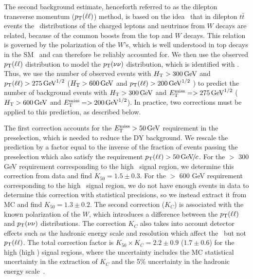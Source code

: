 The second  background estimate, henceforth referred to as the dilepton transverse momentum ($p_{\mathrm{T}}(\ell\ell)$) method, 
is  based on the  idea~\cite{ref:victory} that  in dilepton  $t\bar{t}$  events the
\pt\  distributions of  the charged  leptons and  neutrinos  from $W$
decays are  related, because of the  common boosts from  the top  and $W$
decays.  This relation  is governed by the polarization  of the $W$'s,
which         is         well         understood        in         top
decays in the SM~\cite{Wpolarization,Wpolarization2}   and   can  therefore   be
reliably  accounted   for.   We then  use   the  observed
$p_{\mathrm{T}}(\ell\ell)$ distribution to  model the $p_{\mathrm{T}}(\nu\nu)$ distribution,
which is  identified with \MET.  Thus,  we use the  number of observed
events  with $H_{\mathrm{T}} > 300\,\text{Ge\hspace{-.08em}V}$ and $p_{\mathrm{T}}(\ell\ell)  > 275\,\text{Ge\hspace{-.08em}V}^{1/2}$ 
($H_{\mathrm{T}} > 600\,\text{Ge\hspace{-.08em}V}$ and $p_{\mathrm{T}}(\ell\ell)  > 200\,\text{Ge\hspace{-.08em}V}^{1/2}$ )
to predict the  number of  background events  with 
$H_{\mathrm{T}} >  300\,\text{Ge\hspace{-.08em}V}$ and  $E_{\mathrm{T}}^{\text{miss}} = > 275\,\text{Ge\hspace{-.08em}V}^{1/2}$ ($H_{\mathrm{T}} >  600\,\text{Ge\hspace{-.08em}V}$ and  $E_{\mathrm{T}}^{\text{miss}} = > 200\,\text{Ge\hspace{-.08em}V}^{1/2}$).  
In  practice, two corrections must be applied to this prediction, as described below.

%
%
The first correction  accounts for the $E_{\mathrm{T}}^{\text{miss}} >  50\,\text{Ge\hspace{-.08em}V}$ requirement in the
preselection, which is needed to  reduce the DY background.  We
rescale  the  prediction by  a  factor equal  to  the  inverse of  the
fraction  of  events  passing  the preselection which  also  satisfy  the
requirement  $p_{\mathrm{T}}(\ell\ell) >  50{\,\text{Ge\hspace{-.08em}V\hspace{-0.16em}/\hspace{-0.08em}}c}$.  
For the \Ht $>$ 300 GeV requirement corresponding to the high \MET\ signal region,
we determine this correction from data and find  $K_{50}=1.5 \pm 0.3$.   
For the \Ht $>$ 600 GeV requirement corresponding to the high \Ht\ signal region,
we do not have enough events in data to determine this correction with statistical
precisions, so we instead extract it from MC and find $K_{50}=1.3 \pm 0.2$.
The  second  correction ($K_C$) is  associated with the  known polarization  of the  $W$, which
introduces a difference  between the $p_{\mathrm{T}}(\ell\ell)$ and $p_{\mathrm{T}}(\nu\nu)$
distributions. The correction $K_C$ also takes into account detector effects such as the hadronic energy
scale and  resolution which affect  the \MET\ but  not $p_{\mathrm{T}}(\ell\ell)$.
The  total correction factor  is $K_{50}  \times K_C  = 2.2  \pm 0.9$ ($1.7 \pm 0.6$) for the
high \MET (high \Ht) signal regions, where the uncertainty includes the MC statistical uncertainty 
in the extraction of $K_C$ and the 5\%  uncertainty in  the hadronic energy scale~\cite{ref:jes}.

